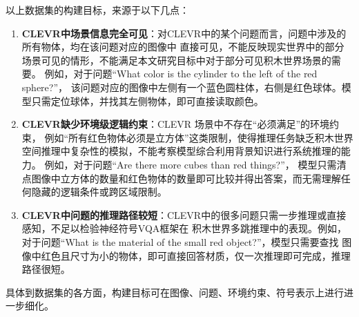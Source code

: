 以上数据集的构建目标，来源于以下几点：
\begin{enumerate}[nosep]
\item \textbf{CLEVR中场景信息完全可见}：对CLEVR中的某个问题而言，问题中涉及的所有物体，均在该问题对应的图像中
直接可见，不能反映现实世界中的部分场景可见的情形，不能满足本文研究目标中对于部分可见积木世界场景的需要。
例如，对于问题“What color is the cylinder to the left of the red sphere?”，
该问题对应的图像中左侧有一个蓝色圆柱体，右侧是红色球体。模型只需定位球体，并找其左侧物体，即可直接读取颜色。
\item \textbf{CLEVR缺少环境级逻辑约束}：CLEVR 场景中不存在“必须满足”的环境约束，
例如“所有红色物体必须是立方体”这类限制，使得推理任务缺乏积木世界空间推理中复杂性的模拟，不能考察模型综合利用背景知识进行系统推理的能力。
例如，对于问题“Are there more cubes than red things?”，
模型只需清点图像中立方体的数量和红色物体的数量即可比较并得出答案，而无需理解任何隐藏的逻辑条件或跨区域限制。
\item \textbf{CLEVR中问题的推理路径较短}：CLEVR中的很多问题只需一步推理或直接感知，不足以检验神经符号VQA框架在
积木世界多跳推理中的表现。例如，对于问题“What is the material of the small red object?”，模型只需要查找
图像中红色且尺寸为小的物体，即可直接回答材质，仅一次推理即可完成，推理路径很短。
\end{enumerate}
具体到数据集的各方面，构建目标可在图像、问题、环境约束、符号表示上进行进一步细化。

